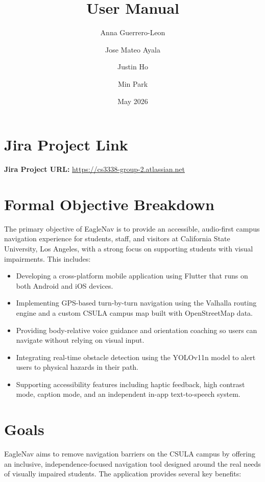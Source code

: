 \documentclass[12pt]{article}
\title{User Manual}
\author{
    Anna Guerrero-Leon\\
    \and
    Jose Mateo Ayala\\
    \and
    Justin Ho\\
    \and
    Min Park\\
    }
\date{May 2026}
\begin{document}
\begin{titlepage}
\maketitle
\thispagestyle{empty}
\end{titlepage}

\section*{Jira Project Link}

\noindent \textbf{Jira Project URL:} \href{https://cs3338-group-2.atlassian.net}{https://cs3338-group-2.atlassian.net}

\section*{Formal Objective Breakdown}

The primary objective of EagleNav is to provide an accessible, audio-first campus navigation experience for students, staff, and visitors at California State University, Los Angeles, with a strong focus on supporting students with visual impairments. This includes:

\begin{itemize}
    \item Developing a cross-platform mobile application using Flutter that runs on both Android and iOS devices.
    \item Implementing GPS-based turn-by-turn navigation using the Valhalla routing engine and a custom CSULA campus map built with OpenStreetMap data.
    \item Providing body-relative voice guidance and orientation coaching so users can navigate without relying on visual input.
    \item Integrating real-time obstacle detection using the YOLOv11n model to alert users to physical hazards in their path.
    \item Supporting accessibility features including haptic feedback, high contrast mode, caption mode, and an independent in-app text-to-speech system.
\end{itemize}

\newpage

\section*{Goals}

EagleNav aims to remove navigation barriers on the CSULA campus by offering an inclusive, independence-focused navigation tool designed around the real needs of visually impaired students. The application provides several key benefits:
\end{document}

